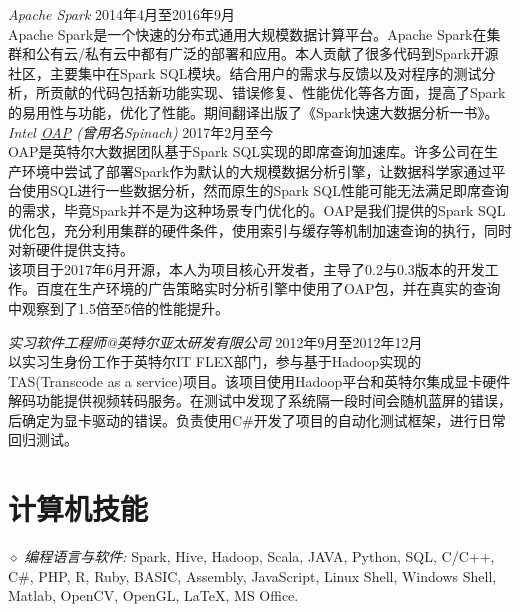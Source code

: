 \documentclass[line,margin]{res}
\begin{document}
\begin{resume}
\begin{itemize}
            {\sl Apache Spark} \hfill        2014年4月至2016年9月 \\
                Apache Spark是一个快速的分布式通用大规模数据计算平台。Apache Spark在集群和公有云/私有云中都有广泛的部署和应用。本人贡献了很多代码到Spark开源社区，主要集中在Spark SQL模块。结合用户的需求与反馈以及对程序的测试分析，所贡献的代码包括新功能实现、错误修复、性能优化等各方面，提高了Spark的易用性与功能，优化了性能。期间翻译出版了《Spark快速大数据分析一书》。\\
                   
             {\sl Intel \href{https://github.com/Intel-bigdata/OAP}{OAP} (曾用名Spinach)} \hfill        2017年2月至今\\
                OAP是英特尔大数据团队基于Spark SQL实现的即席查询加速库。许多公司在生产环境中尝试了部署Spark作为默认的大规模数据分析引擎，让数据科学家通过平台使用SQL进行一些数据分析，然而原生的Spark SQL性能可能无法满足即席查询的需求，毕竟Spark并不是为这种场景专门优化的。OAP是我们提供的Spark SQL优化包，充分利用集群的硬件条件，使用索引与缓存等机制加速查询的执行，同时对新硬件提供支持。\\
                该项目于2017年6月开源，本人为项目核心开发者，主导了0.2与0.3版本的开发工作。百度在生产环境的广告策略实时分析引擎中使用了OAP包，并在真实的查询中观察到了1.5倍至5倍的性能提升。\\

        \end{itemize}

      {\sl 实习软件工程师@英特尔亚太研发有限公司} \hfill         2012年9月至2012年12月\\
             以实习生身份工作于英特尔IT FLEX部门，参与基于Hadoop实现的TAS(Transcode as a service)项目。该项目使用Hadoop平台和英特尔集成显卡硬件解码功能提供视频转码服务。在测试中发现了系统隔一段时间会随机蓝屏的错误，后确定为显卡驱动的错误。负责使用C\#开发了项目的自动化测试框架，进行日常回归测试。

\section{计算机技能} {$\diamond$ \sl 编程语言与软件:} Spark, Hive, Hadoop, Scala, JAVA, Python, SQL, C/C++, C\#, PHP, R, Ruby, BASIC, Assembly, JavaScript, Linux Shell, Windows Shell, Matlab, OpenCV, OpenGL, \LaTeX, MS Office. \\


\end{resume}
\end{document}
